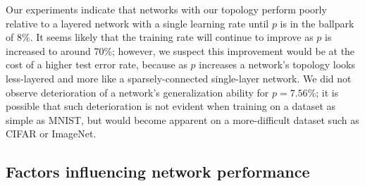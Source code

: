 \documentclass[format=sigconf]{acmart}
\begin{document}
Our experiments indicate that networks with our topology perform poorly relative to a layered network with a single learning rate until $p$ is in the ballpark of $8\%$. It seems likely that the training rate will continue to improve as $p$ is increased to around 70\%; however, we suspect this improvement would be at the cost of a higher test error rate, because as $p$ increases a network's topology looks less-layered and more like a sparsely-connected single-layer network. We did not observe deterioration of a network's generalization ability for $p=7.56\%$; it is possible that such deterioration is not evident when training on a dataset as simple as MNIST, but would become apparent on a more-difficult dataset such as CIFAR or ImageNet.

\subsection{Factors influencing network performance}
\label{sec:disc_factors}
\end{document}
